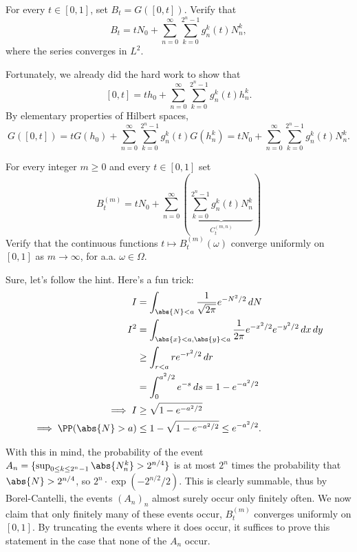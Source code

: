 \documentclass{scrartcl}
\begin{document}
\begin{prob}
    For every $t \in [0,1]$, set $B_t = G([0,t])$. Verify that
    \[B_t = tN_0 + \sum_{n=0}^\infty \sum_{k=0}^{2^n-1} g_n^k(t)N_n^k,\]
    where the series converges in $L^2$. 
\end{prob}
Fortunately, we already did the hard work to show that
\[
    [0,t] = t h_0 + \sum_{n=0}^\infty \sum_{k=0}^{2^n-1} g_n^k(t) h_n^k.
\]
By elementary properties of Hilbert spaces,
\[
    G([0,t]) = tG(h_0) + \sum_{n=0}^\infty \sum_{k=0}^{2^n-1} g_n^k(t)G(h_n^k) = tN_0 + \sum_{n=0}^\infty \sum_{k=0}^{2^n-1} g_n^k(t)N_n^k.
\]
\begin{prob}
    For every integer $m \geq 0$ and every $t \in [0,1]$ set
\[B^{(m)}_t = tN_0 + \sum_{n=0}^\infty \left(\underbrace{\sum_{k = 0}^{2^n - 1} g_n^k(t)N_n^k}_{C^{(m,n)}_t}\right)\]
Verify that the continuous functions $t \mapsto B^{(m)}_t(\omega)$ converge uniformly on $[0,1]$ as $m \to \infty$, for a.a. $\omega \in \Omega$.
\end{prob}
\pagebreak
{}

Sure, let's follow the hint. Here's a fun trick:
\begin{align*}
    I &= \int_{\abs{N} < a} \frac{1}{\sqrt{2\pi}} e^{-N^2/2} \, dN\\
    I^2 &= \int_{\abs{x} < a, \abs{y} < a} \frac{1}{2\pi} e^{-x^2/2} e^{-y^2/2} \, dx \, dy\\
    &\geq \int_{r < a} r e^{-r^2/2} \, dr\\
    &= \int_0^{a^2/2} e^{-s} \, ds = 1 - e^{-a^2/2}\\
    \implies I &\geq \sqrt{1 - e^{-a^2/2}}\\
    \implies \PP(\abs{N} > a) & \leq 1 - \sqrt{1 - e^{-a^2/2}} \leq e^{-a^2/2}.
\end{align*}

With this in mind, the probability of the event $A_n = \{\sup_{0 \leq k \leq 2^n-1} \abs{N_n^k} > 2^{n/4}\}$ is at most $2^n$ times the probability that $\abs{N} > 2^{n/4}$, so $2^n \cdot \exp\left(- 2^{n/2} / 2\right)$. This is clearly summable, thus by Borel-Cantelli, the events $(A_n)_n$ almost surely occur only finitely often. We now claim that only finitely many of these events occur, $B^{(m)}_t$ converges uniformly on $[0,1]$. By truncating the events where it does occur, it suffices to prove this statement in the case that none of the $A_n$ occur.
\end{document}
